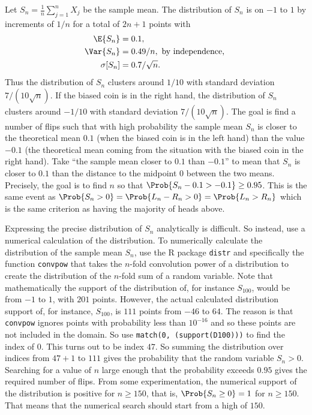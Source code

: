 \documentclass[12pt]{article}
\begin{document}
Let \( S_n = \frac{1}{n} \sum\limits_{j=1}^n X_j \) be the sample mean.
The distribution of \( S_n \) is on \( -1 \) to \( 1 \) by increments of
\( 1/n \) for a total of \( 2n+1 \) points with
\begin{align*}
    \E{S_n} &= 0.1, \\
    \Var{S_n} &= 0.49/n, \text{ by independence, } \\
    \sigma[S_n] &= 0.7/\sqrt{n}.
\end{align*}
Thus the distribution of \( S_n \) clusters around \( 1/10 \) with
standard deviation \( 7/(10 \sqrt{n}) \).%
If the biased coin is in the right hand, the distribution of \( S_n \)
clusters around \( -1/10 \) with standard deviation \( 7/(10 \sqrt{n}) \).%
The goal is find a number of flips such that with high probability the
sample mean \( S_n \) is closer to the theoretical mean \( 0.1 \) (when
the biased coin is in the left hand) than the value \( -0.1 \) (the
theoretical mean coming from the situation with the biased coin in the
right hand). Take ``the sample mean closer to \( 0.1 \) than \( -0.1 \)''
to mean that \( S_n \) is closer to \( 0.1 \) than the distance to the
midpoint \( 0 \) between the two means.  Precisely, the goal is to find \(
n \) so that \( \Prob{S_n - 0.1 > -0.1} \ge 0.95 \).  This is the same
event as \( \Prob{S_n > 0} = \Prob{L_n-R_n > 0} = \Prob{L_n > R_n} \)
which is the same criterion as having the majority of heads above.

Expressing the precise distribution of \( S_n \) analytically is
difficult.  So instead, use a numerical calculation of the distribution.
To numerically calculate the distribution of the sample mean \( S_{n} \),
use the R package \texttt{distr} and specifically the function \texttt{convpow}
that takes the \( n \)-fold convolution power of a distribution to
create the distribution of the \( n \)-fold sum of a random variable.%
Note that mathematically the support of the distribution of, for
instance \( S_{100} \), would be from \( -1 \) to \( 1 \), with \( 201 \)
points.  However, the actual calculated distribution support of, for
instance, \( S_{100} \), is \( 111 \) points from \( -46 \) to \( 64 \).
The reason is that \texttt{convpow} ignores points with probability less
than \( 10^{-16} \) and so these points are not included in the domain.
So use \texttt{match(0, (support(D100)))} to find the index of \( 0 \).
This turns out to be index \( 47 \).  So summing the distribution over
indices from \( 47+1 \) to \( 111 \) gives the probability that the
random variable \( S_{n} > 0 \). Searching for a value of \( n \) large
enough that the probability exceeds \( 0.95 \) gives the required number
of flips. From some experimentation, the numerical support of the
distribution is positive for \( n \ge 150 \), that is, \( \Prob{S_{n}
\ge 0} = 1 \) for \( n \ge 150 \).  That means that the numerical search
should start from a high of \( 150 \).
\end{document}
